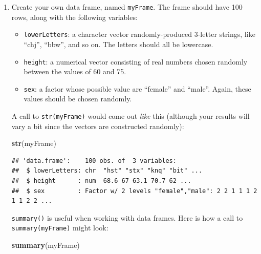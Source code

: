 \documentclass[]{book}
\makeatletter
\newenvironment{Shaded}{\begin{snugshade}}{\end{snugshade}}
\newcommand{\KeywordTok}[1]{\textcolor[rgb]{0.13,0.29,0.53}{\textbf{#1}}}
\newcommand{\NormalTok}[1]{#1}
\providecommand{\tightlist}{%
  \setlength{\itemsep}{0pt}\setlength{\parskip}{0pt}}
\newenvironment{kframe}{%
\medskip{}
\setlength{\fboxsep}{.8em}
 \def\at@end@of@kframe{}%
 \ifinner\ifhmode%
  \def\at@end@of@kframe{\end{minipage}}%
  \begin{minipage}{\columnwidth}%
 \fi\fi%
 \def\FrameCommand##1{\hskip\@totalleftmargin \hskip-\fboxsep
 \colorbox{shadecolor}{##1}\hskip-\fboxsep
     \hskip-\linewidth \hskip-\@totalleftmargin \hskip\columnwidth}%
 \MakeFramed {\advance\hsize-\width
   \@totalleftmargin\z@ \linewidth\hsize
   \@setminipage}}%
 {\par\unskip\endMakeFramed%
 \at@end@of@kframe}
\renewenvironment{Shaded}{\begin{kframe}}{\end{kframe}}
\theoremstyle{definition}
\theoremstyle{definition}
\theoremstyle{definition}
\theoremstyle{remark}
\makeatother
\begin{document}
{\begin{enumerate}
\begin{verbatim}
## No can do!  The frame has only 15 rows.
\end{verbatim}

  \textbf{Hint}: Use the function \texttt{nrow()}, which gives the
  number of rows of a matrix or data frame.
\item
  Create your own data frame, named \texttt{myFrame}. The frame should
  have 100 rows, along with the following variables:

  \begin{itemize}
  \tightlist
  \item
    \texttt{lowerLetters}: a character vector randomly-produced 3-letter
    strings, like ``chj'', ``bbw'', and so on. The letters should all be
    lowercase.
  \item
    \texttt{height}: a numerical vector consisting of real numbers
    chosen randomly between the values of 60 and 75.
  \item
    \texttt{sex}: a factor whose possible value are ``female'' and
    ``male''. Again, these values should be chosen randomly.
  \end{itemize}

  A call to \texttt{str(myFrame)} would come out \emph{like} this
  (although your results will vary a bit since the vectors are
  constructed randomly):

\begin{Shaded}
\begin{Highlighting}[]
\KeywordTok{str}\NormalTok{(myFrame)}
\end{Highlighting}
\end{Shaded}

\begin{verbatim}
## 'data.frame':    100 obs. of  3 variables:
##  $ lowerLetters: chr  "hst" "stx" "knq" "bit" ...
##  $ height      : num  68.6 67 63.1 70.7 62 ...
##  $ sex         : Factor w/ 2 levels "female","male": 2 2 1 1 1 2 1 1 2 2 ...
\end{verbatim}

  \texttt{summary()} is useful when working with data frames. Here is
  how a call to \texttt{summary(myFrame)} might look:

\begin{Shaded}
\begin{Highlighting}[]
\KeywordTok{summary}\NormalTok{(myFrame)}
\end{Highlighting}
\end{Shaded}


\end{enumerate}}
\end{document}
